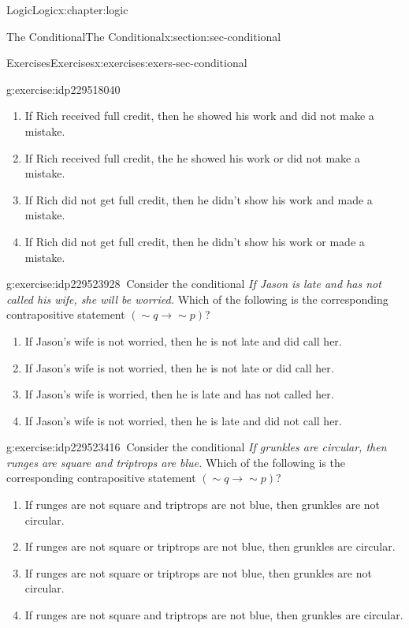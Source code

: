 \documentclass[twoside,10pt,]{book}
\numberwithin{equation}{section}
\newcommand{\contrapositive}{{\sim\!{q}{} {\rightarrow} \sim\!{p}{}}}
\begin{document}
\begin{chapterptx}{Logic}{}{Logic}{}{}{x:chapter:logic}
\begin{sectionptx}{The Conditional}{}{The Conditional}{}{}{x:section:sec-conditional}
\begin{exercises-subsection}{Exercises}{}{Exercises}{}{}{x:exercises:exers-sec-conditional}
\begin{divisionexercise}{34}{}{}{g:exercise:idp229518040}
\begin{enumerate}[label=(\alph*)]
\item{}If Rich received full credit, then he showed his work and did not make a mistake.%
\item{}If Rich received full credit, the he showed his work or did not make a mistake.%
\item{}If Rich did not get full credit, then he didn't show his work and made a mistake.%
\item{}If Rich did not get full credit, then he didn't show his work or made a mistake.%
\end{enumerate}
\end{divisionexercise}%
\begin{divisionexercise}{35}{}{}{g:exercise:idp229523928}%
\(\ \)Consider the conditional \emph{If Jason is late and has not called his wife, she will be worried.}  Which of the following is the corresponding contrapositive statement \((\contrapositive)\)? %
\begin{enumerate}[label=(\alph*)]
\item{}If Jason's wife is not worried, then he is not late and did call her.%
\item{}If Jason's wife is not worried, then he is not late or did call her.%
\item{}If Jason's wife is worried, then he is late and has not called her.%
\item{}If Jason's wife is not worried, then he is late and did not call her.%
\end{enumerate}
\end{divisionexercise}%
\begin{divisionexercise}{36}{}{}{g:exercise:idp229523416}%
\(\ \)Consider the conditional \emph{If grunkles are circular, then runges are square and triptrops are blue.}  Which of the following is the corresponding contrapositive statement \((\contrapositive)\)? %
\begin{enumerate}[label=(\alph*)]
\item{}If runges are not square and triptrops are not blue, then grunkles are not circular.%
\item{}If runges are not square or triptrops are not blue, then grunkles are circular.%
\item{}If runges are not square or triptrops are not blue, then grunkles are not circular.%
\item{}If runges are not square and triptrops are not blue, then grunkles are circular.%
\end{enumerate}

\end{divisionexercise}
\end{exercises-subsection}
\end{sectionptx}
\end{chapterptx}
\end{document}
